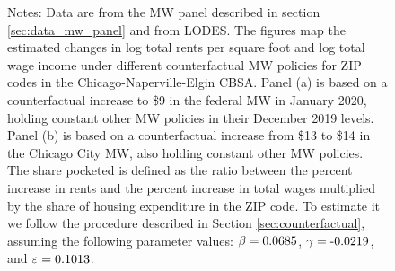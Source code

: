 \begin{figure}[h!]
    \begin{minipage}{.95\textwidth} \footnotesize
        \vspace{3mm}
        Notes: 
        Data are from the MW panel described in section \ref{sec:data_mw_panel} 
        and from LODES.
        The figures map the estimated changes in log total rents per square foot
        and log total wage income under different counterfactual MW policies for 
        ZIP codes in the Chicago-Naperville-Elgin CBSA.
        Panel (a) is based on a counterfactual increase to \$9 in the 
        federal MW in January 2020, holding constant other MW policies in their 
        December 2019 levels.
        Panel (b) is based on a counterfactual increase from \$13 to \$14 in the 
        Chicago City MW, also holding constant other MW policies.
        The share pocketed is defined as the ratio between the percent increase 
        in rents and the percent increase in total wages multiplied by the share 
        of housing expenditure in the ZIP code.
        To estimate it we follow the procedure described in Section 
        \ref{sec:counterfactual}, assuming the following parameter values: 
        $\beta = \textnormal{0.0685}$, $\gamma = \textnormal{-0.0219}$, and $\varepsilon = \textnormal{0.1013}$.
    \end{minipage}
\end{figure}
